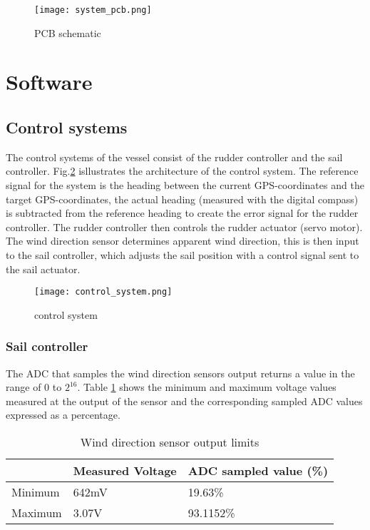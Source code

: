 \begin{figure}[!h]
    \centering
    \texttt{[image: system\_pcb.png]}
    \caption[PCB schematic]{PCB schematic}
    \label{fig:pcb}
\end{figure}



\section{Software}

\subsection{Control systems}
The control systems of the vessel consist of the rudder controller and the sail controller. Fig.\ref{fig:control-system} isllustrates the architecture of the control system. The reference signal
for the system is the heading between the current GPS-coordinates and the target GPS-coordinates, the actual heading (measured with the digital compass) is subtracted from the reference heading
to create the error signal for the rudder controller. The rudder controller then controls the rudder actuator (servo motor). 
The wind direction sensor determines apparent wind direction, this 
is then input to the sail controller, which adjusts the sail position with a control signal sent to the sail actuator.

\begin{figure}[!h]
    \centering
    \texttt{[image: control\_system.png]}
    \caption[Control system]{control system}
    \label{fig:control-system}
\end{figure}


\subsubsection{Sail controller}

The ADC that samples the wind direction sensors output returns a value in the range of 0 to $2^{16}$. Table \ref{table:adc-limits} shows the minimum and maximum voltage values measured at the output of 
the sensor and the corresponding sampled ADC values expressed as a percentage. 

\begin{table}[!h]
    \centering
    \caption{Wind direction sensor output limits}
    \label{table:adc-limits}
    \begin{tabularx}{\columnwidth}{ | X | X | X | }
        
        \hline
         &Measured Voltage & ADC sampled value (\%)\\
        \hline
        Minimum & 642mV & 19.63\%  \\
        \hline
        Maximum & 3.07V & 93.1152\%  \\
        \hline
    \end{tabularx}
\end{table}


